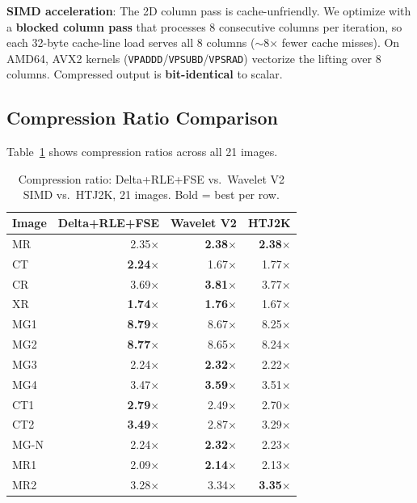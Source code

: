 \documentclass[10pt,twocolumn]{article}
\begin{document}
\textbf{SIMD acceleration}: The 2D column pass is cache-unfriendly. We optimize with a \textbf{blocked column pass} that processes 8 consecutive columns per iteration, so each 32-byte cache-line load serves all 8 columns ($\sim$8$\times$ fewer cache misses). On AMD64, AVX2 kernels (\texttt{VPADDD}/\texttt{VPSUBD}/\texttt{VPSRAD}) vectorize the lifting over 8 columns. Compressed output is \textbf{bit-identical} to scalar.

\subsection{Compression Ratio Comparison}

Table~\ref{tab:waveletratio} shows compression ratios across all 21 images.

\begin{table}[h]
  \centering
  \caption{Compression ratio: Delta+RLE+FSE vs.\ Wavelet V2 SIMD vs.\ HTJ2K, 21 images. Bold = best per row.}
  \label{tab:waveletratio}
  \small
  \setlength{\tabcolsep}{4pt}
  \begin{tabular}{lrrr}
    \toprule
    Image & Delta+RLE+FSE & Wavelet V2 & HTJ2K \\
    \midrule
    MR    & 2.35$\times$ & \textbf{2.38$\times$} & \textbf{2.38$\times$} \\
    CT    & \textbf{2.24$\times$} & 1.67$\times$ & 1.77$\times$ \\
    CR    & 3.69$\times$ & \textbf{3.81$\times$} & 3.77$\times$ \\
    XR    & \textbf{1.74$\times$} & \textbf{1.76$\times$} & 1.67$\times$ \\
    MG1   & \textbf{8.79$\times$} & 8.67$\times$ & 8.25$\times$ \\
    MG2   & \textbf{8.77$\times$} & 8.65$\times$ & 8.24$\times$ \\
    MG3   & 2.24$\times$ & \textbf{2.32$\times$} & 2.22$\times$ \\
    MG4   & 3.47$\times$ & \textbf{3.59$\times$} & 3.51$\times$ \\
    CT1   & \textbf{2.79$\times$} & 2.49$\times$ & 2.70$\times$ \\
    CT2   & \textbf{3.49$\times$} & 2.87$\times$ & 3.29$\times$ \\
    MG-N  & 2.24$\times$ & \textbf{2.32$\times$} & 2.23$\times$ \\
    MR1   & 2.09$\times$ & \textbf{2.14$\times$} & 2.13$\times$ \\
    MR2   & 3.28$\times$ & 3.34$\times$ & \textbf{3.35$\times$} \\

\end{tabular}
\end{table}
\end{document}
